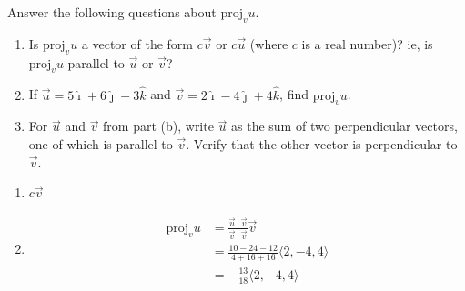 \documentclass[handout]{ximera}
\begin{document}
\begin{problem}
Answer the following questions about $\text{proj}_v u$.
	\begin{enumerate}
	\item  Is $\text{proj}_v u$ a vector of the form $c \vec{v}$ or $c \vec{u}$ (where $c$ is a real number)?  
	ie, is $\text{proj}_v u$ parallel to $\vec{u}$ or $\vec{v}$?  
	
	\item  If $\vec{u} = 5 \hat{\imath} + 6 \hat{\jmath} - 3 \hat{k}$ and $\vec{v} = 2 \hat{\imath} - 4 \hat{\jmath} + 4 \hat{k}$, find $\text{proj}_v u$.
	
	\item  For $\vec{u}$ and $\vec{v}$ from part (b), write $\vec{u}$ as the sum of two perpendicular vectors, one of which is parallel to $\vec{v}$.  Verify that the other vector is perpendicular to $\vec{v}$.
	\end{enumerate}
	
	\begin{freeResponse}
	\begin{enumerate}
	\item  $\boxed{c \vec{v}}$
	
	\item  
		\begin{align*}
		\text{proj}_v u 
		&= \frac{\vec{u} \cdot \vec{v}}{\vec{v} \cdot \vec{v}} \vec{v}  \\
		&= \frac{10-24-12}{4+16+16} \langle 2,-4,4 \rangle  \\
		&= \boxed{- \frac{13}{18} \langle 2,-4,4 \rangle  }
		\end{align*}
	
	
	

\end{enumerate}
\end{freeResponse}
\end{problem}
\end{document}
